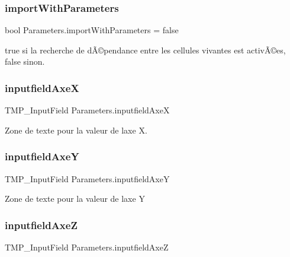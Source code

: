 \subsubsection{\texorpdfstring{import\+With\+Parameters}{importWithParameters}}
{\footnotesize\ttfamily bool Parameters.\+import\+With\+Parameters = false\hspace{0.3cm}{\ttfamily [private]}}



true si la recherche de dÃ©pendance entre les cellules vivantes est activÃ©es, false sinon. 

\mbox{\label{class_parameters_a144f3907a5a97b677777c361e1732d87}} 
\subsubsection{\texorpdfstring{inputfield\+AxeX}{inputfieldAxeX}}
{\footnotesize\ttfamily T\+M\+P\+\_\+\+Input\+Field Parameters.\+inputfield\+AxeX\hspace{0.3cm}{\ttfamily [private]}}



Zone de texte pour la valeur de l\textquotesingle{}axe X. 

\mbox{\label{class_parameters_a7a8f81335eea4caef79b5b2aee17e473}} 
\subsubsection{\texorpdfstring{inputfield\+AxeY}{inputfieldAxeY}}
{\footnotesize\ttfamily T\+M\+P\+\_\+\+Input\+Field Parameters.\+inputfield\+AxeY\hspace{0.3cm}{\ttfamily [private]}}



Zone de texte pour la valeur de l\textquotesingle{}axe Y 

\mbox{\label{class_parameters_aa791b4cf0b210915f89c2d302a4e7512}} 
\subsubsection{\texorpdfstring{inputfield\+AxeZ}{inputfieldAxeZ}}
{\footnotesize\ttfamily T\+M\+P\+\_\+\+Input\+Field Parameters.\+inputfield\+AxeZ\hspace{0.3cm}{\ttfamily [private]}}



